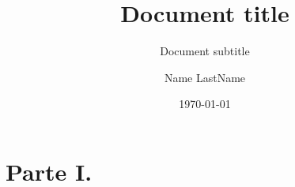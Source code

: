 \documentclass{config/class}			%
\title{Document title}			%
\subtitle{Document subtitle}	%
\author{
	 Name LastName %
}
\date{\today}
\begin{document}
 
\frontmatter

\maketitle	%

\sloppy

\mainmatter
\part*{Parte I.}

% 

% 

\backmatter

\end{document}
